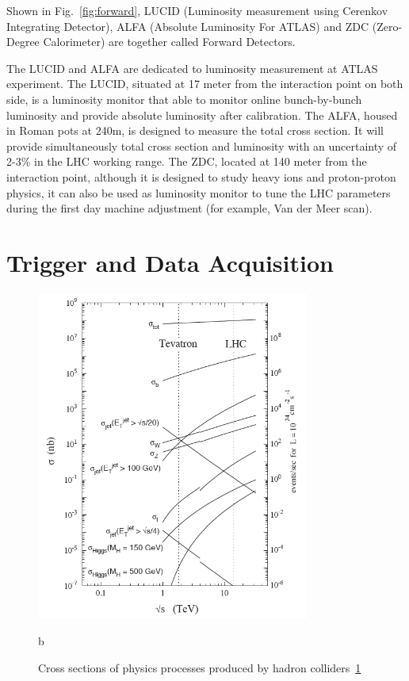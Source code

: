 \par Shown in Fig.~\ref{fig:forward}, LUCID (Luminosity measurement using Cerenkov Integrating Detector), ALFA (Absolute Luminosity For ATLAS) and ZDC (Zero-Degree Calorimeter) are together called Forward Detectors. 

\par The LUCID and ALFA are dedicated to luminosity measurement at ATLAS experiment. The LUCID, situated at 17 meter from the interaction point on both side, is a luminosity monitor that able to monitor online bunch-by-bunch luminosity and provide absolute luminosity after calibration. The ALFA, housed in Roman pots at 240m, is designed to measure the total cross section. It will provide simultaneously total cross section and luminosity with an uncertainty of 2-3\% in the LHC working range. The ZDC, located at 140 meter from the interaction point, although it is designed to study heavy ions and proton-proton physics, it can also be used as luminosity monitor to tune the LHC parameters during the first day machine adjustment (for example, Van der Meer scan).

\section{Trigger and Data Acquisition}
\label{sec:data}

\begin{figure}[htbp!]
    \centering
    \includegraphics[width=0.8\textwidth]{chapters/c4/figures/cross}
    \caption{b}
    \label{fig:cross}
    \caption{Cross sections of physics processes produced by hadron colliders~\ref{fig:cross}}
\end{figure}

